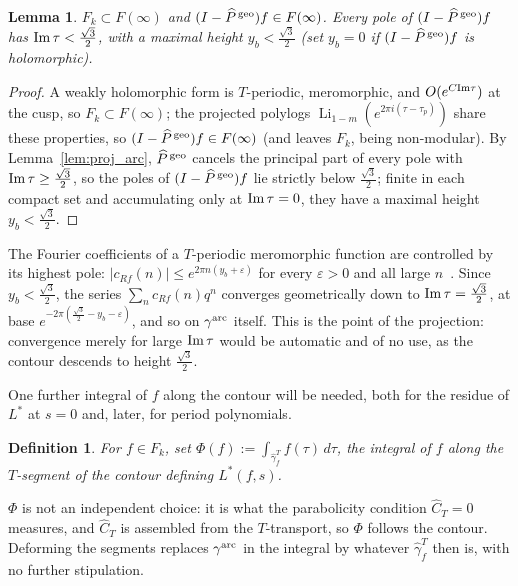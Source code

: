 \documentclass[11pt]{article}
\newtheorem{lemma}[theorem]{Lemma}
\newtheorem{definition}[theorem]{Definition}
\DeclareMathOperator{\Li}{Li}
\begin{document}
\begin{lemma}\label{lem:projspace_arc}
$F_k\subset F(\infty)$ and $(I-\widehat P^{\,\rm geo})f\in F(\infty)$. Every pole of
$(I-\widehat P^{\,\rm geo})f$ has ${\rm Im}\,\tau<\tfrac{\sqrt3}{2}$, with a maximal height
$y_b<\tfrac{\sqrt3}{2}$ (set $y_b=0$ if $(I-\widehat P^{\,\rm geo})f$ is holomorphic).
\end{lemma}
\begin{proof}
A weakly holomorphic form is $T$-periodic, meromorphic, and $O(e^{C{\rm Im}\tau})$ at the cusp, so
$F_k\subset F(\infty)$; the projected polylogs $\Li_{1-m}(e^{2\pi i(\tau-\tau_p)})$ share these
properties, so $(I-\widehat P^{\,\rm geo})f\in F(\infty)$ (and leaves $F_k$, being non-modular). By
Lemma~\ref{lem:proj_arc}, $\widehat P^{\,\rm geo}$ cancels the principal part of every pole with
${\rm Im}\,\tau\ge\tfrac{\sqrt3}{2}$, so the poles of $(I-\widehat P^{\,\rm geo})f$ lie strictly
below $\tfrac{\sqrt3}{2}$; finite in each compact set and accumulating only at ${\rm Im}\,\tau=0$,
they have a maximal height $y_b<\tfrac{\sqrt3}{2}$.
\end{proof}

The Fourier coefficients of a $T$-periodic meromorphic function are controlled by its highest pole:
$|c_{Rf}(n)|\le e^{2\pi n(y_b+\varepsilon)}$ for every $\varepsilon>0$ and all large
$n$~\cite{1806}. Since $y_b<\tfrac{\sqrt3}{2}$, the series $\sum_n c_{Rf}(n)q^n$ converges
geometrically down to ${\rm Im}\,\tau=\tfrac{\sqrt3}{2}$, at base
$e^{-2\pi(\frac{\sqrt3}{2}-y_b-\varepsilon)}$, and so on $\gamma^{\rm arc}$ itself. This is the
point of the projection: convergence merely for large ${\rm Im}\,\tau$ would be automatic and of no
use, as the contour descends to height $\tfrac{\sqrt3}{2}$.

One further integral of $f$ along the contour will be needed, both for the residue of $L^*$ at
$s=0$ and, later, for period polynomials.

\begin{definition}\label{def:Phi}
For $f\in F_k$, set $\Phi(f):=\int_{\hat\gamma^T_f}f(\tau)\,d\tau$, the integral of $f$ along the
$T$-segment of the contour defining $L^*(f,s)$.
\end{definition}

$\Phi$ is not an independent choice: it is what the parabolicity condition $\hat C_T=0$ measures,
and $\hat C_T$ is assembled from the $T$-transport, so $\Phi$ follows the contour. Deforming the
segments replaces $\gamma^{\rm arc}$ in the integral by whatever $\hat\gamma^T_f$ then is, with no
further stipulation.
\end{document}

